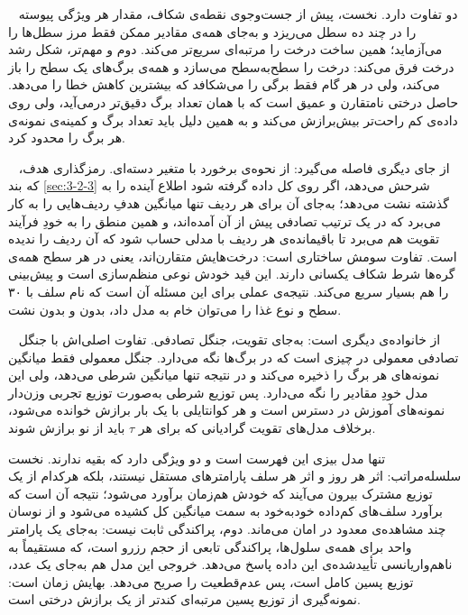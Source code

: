 ~\cite{Ke17lightgbm} دو تفاوت دارد. نخست، پیش از
جست‌وجوی نقطه‌ی شکاف، مقدار هر ویژگی پیوسته را در چند ده سطل می‌ریزد و به‌جای همه‌ی
مقادیر ممکن فقط مرز سطل‌ها را می‌آزماید؛ همین ساخت درخت را مرتبه‌ای سریع‌تر می‌کند. دوم و
مهم‌تر، شکل رشد درخت فرق می‌کند:  درخت را سطح‌به‌سطح می‌سازد و همه‌ی برگ‌های
یک سطح را باز می‌کند، ولی  در هر گام فقط برگی را می‌شکافد که بیشترین کاهش
خطا را می‌دهد. حاصل درختی نامتقارن و عمیق است که با همان تعداد برگ دقیق‌تر درمی‌آید، ولی
روی داده‌ی کم راحت‌تر بیش‌برازش می‌کند و به همین دلیل باید تعداد برگ و کمینه‌ی نمونه‌ی هر
برگ را محدود کرد.

~\cite{Prokhorenkova18catboost} از جای دیگری فاصله
می‌گیرد: از نحوه‌ی برخورد با متغیر دسته‌ای. رمزگذاری هدف، که بند \ref{sec:3-2-3} شرحش
می‌دهد، اگر روی کل داده گرفته شود اطلاع آینده را به گذشته نشت می‌دهد؛ 
به‌جای آن برای هر ردیف تنها میانگین هدفِ ردیف‌هایی را به کار می‌برد که در یک ترتیب
تصادفی پیش از آن آمده‌اند، و همین منطق را به خودِ فرآیند تقویت هم می‌برد تا باقیمانده‌ی
هر ردیف با مدلی حساب شود که آن ردیف را ندیده است. تفاوت سومش ساختاری است: درخت‌هایش
متقارن‌اند، یعنی در هر سطح همه‌ی گره‌ها شرط شکاف یکسانی دارند. این قید خودش نوعی
منظم‌سازی است و پیش‌بینی را هم بسیار سریع می‌کند. نتیجه‌ی عملی برای این مسئله آن است که
نام سلف با ۳۰ سطح و نوع غذا را می‌توان خام به مدل داد، بدون  و بدون نشت.

~\cite{Meinshausen06qrf} از خانواده‌ی دیگری است: به‌جای تقویت، جنگل
تصادفی. تفاوت اصلی‌اش با جنگل تصادفی معمولی در چیزی است که در برگ‌ها نگه می‌دارد. جنگل
معمولی فقط میانگین نمونه‌های هر برگ را ذخیره می‌کند و در نتیجه تنها میانگین شرطی می‌دهد،
ولی این مدل خودِ مقادیر را نگه می‌دارد. پس توزیع شرطی به‌صورت توزیع تجربی وزن‌دار
نمونه‌های آموزش در دسترس است و هر کوانتایلی با یک بار برازش خوانده می‌شود، برخلاف
مدل‌های تقویت گرادیانی که برای هر $\tau$ باید از نو برازش شوند.

 تنها مدل بیزی این فهرست است و دو ویژگی دارد که
بقیه ندارند. نخست سلسله‌مراتب: اثر هر روز و اثر هر سلف پارامترهای مستقل نیستند، بلکه
هرکدام از یک توزیع مشترک بیرون می‌آیند که خودش هم‌زمان برآورد می‌شود؛ نتیجه آن است که
برآورد سلف‌های کم‌داده خودبه‌خود به سمت میانگین کل کشیده می‌شود و از نوسان چند مشاهده‌ی
معدود در امان می‌ماند. دوم، پراکندگی ثابت نیست: به‌جای یک پارامتر واحد برای همه‌ی
سلول‌ها، پراکندگی تابعی از حجم رزرو است، که مستقیماً به ناهم‌واریانسی تأییدشده‌ی این داده
پاسخ می‌دهد. خروجی این مدل هم به‌جای یک عدد، توزیع پسین کامل است، پس عدم‌قطعیت را صریح
می‌دهد. بهایش زمان است: نمونه‌گیری از توزیع پسین مرتبه‌ای کندتر از یک برازش درختی است.

